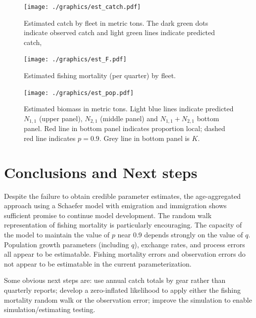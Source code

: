 \documentclass[12pt,letterpaper]{article}
\newcommand\None{{N_{1,1}}}
\newcommand\Ntwo{{N_{2,1}}}
\newcommand\Nsum{{N_{1,1}+N_{2,1}}}
\begin{document}
\begin{figure}
\begin{center}
\texttt{[image: ./graphics/est\_catch.pdf]}
\caption{\label{fig:estC}
Estimated catch by fleet in metric tons. 
The dark green dots indicate observed catch
and light green lines indicate predicted catch,
}
\end{center}
\end{figure}

\begin{figure}
\begin{center}
\texttt{[image: ./graphics/est\_F.pdf]}
\caption{\label{fig:estF}
Estimated fishing mortality (per quarter) by fleet.
}
\end{center}
\end{figure}

\begin{figure}
\begin{center}
\texttt{[image: ./graphics/est\_pop.pdf]}
\caption{\label{fig:estB}
Estimated biomass in metric tons. 
Light blue lines indicate predicted $\None$ (upper
panel), $\Ntwo$ (middle panel) and $\Nsum$ bottom panel. Red line in
bottom panel indicates proportion local; dashed red line indicates
$p=0.9$. Grey line in bottom panel is $K$.
}
\end{center}
\end{figure}

\section*{Conclusions and Next steps}

Despite the failure to obtain credible parameter estimates,
the age-aggregated approach using a Schaefer model with emigration and
immigration shows sufficient promise to continue model development.
The random walk
representation of fishing mortality is particularly encouraging.
The capacity of the model to maintain the value of $p$ near 0.9
depends strongly on the value of $q$.
Population growth parameters (including $q$),  exchange rates,
 and process errors all appear to be estimatable. 
Fishing mortality errors and observation
errors do not appear to be estimatable in the current parameterization.

Some obvious next steps are: use annual catch totals by gear rather
than quarterly reports; develop a zero-inflated likelihood to apply 
either the fishing mortality random walk or the observation error; improve the
simulation to enable simulation/estimating testing.
\end{document}
